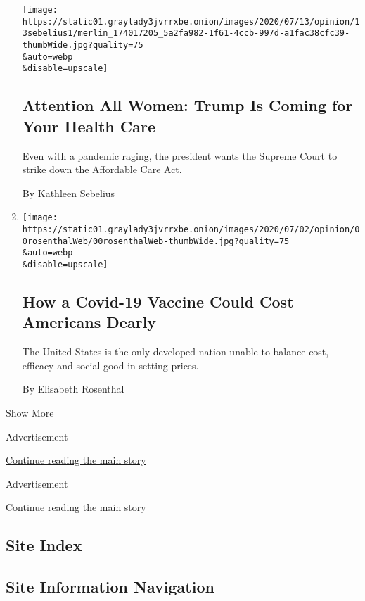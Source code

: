 \begin{enumerate}
  \texttt{[image: https://static01.graylady3jvrrxbe.onion/images/2020/07/13/opinion/13sebelius1/merlin\_174017205\_5a2fa982-1f61-4ccb-997d-a1fac38cfc39-thumbWide.jpg?quality=75\\\&auto=webp\\\&disable=upscale]}

  \hypertarget{attention-all-women-trump-is-coming-for-your-health-care}{%
  \subsection{Attention All Women: Trump Is Coming for Your Health
  Care}\label{attention-all-women-trump-is-coming-for-your-health-care}}

  Even with a pandemic raging, the president wants the Supreme Court to
  strike down the Affordable Care Act.

  By Kathleen Sebelius
\item
  \href{/2020/07/06/opinion/coronavirus-vaccine-cost.html}{}

  \texttt{[image: https://static01.graylady3jvrrxbe.onion/images/2020/07/02/opinion/00rosenthalWeb/00rosenthalWeb-thumbWide.jpg?quality=75\\\&auto=webp\\\&disable=upscale]}

  \hypertarget{how-a-covid-19-vaccine-could-cost-americans-dearly}{%
  \subsection{How a Covid-19 Vaccine Could Cost Americans
  Dearly}\label{how-a-covid-19-vaccine-could-cost-americans-dearly}}

  The United States is the only developed nation unable to balance cost,
  efficacy and social good in setting prices.

  By Elisabeth Rosenthal
\end{enumerate}

Show More

Advertisement

\protect\hyperlink{after-mid2}{Continue reading the main story}

Advertisement

\protect\hyperlink{after-mktg}{Continue reading the main story}

\hypertarget{site-index}{%
\subsection{Site Index}\label{site-index}}

\hypertarget{site-information-navigation}{%
\subsection{Site Information
Navigation}\label{site-information-navigation}}

